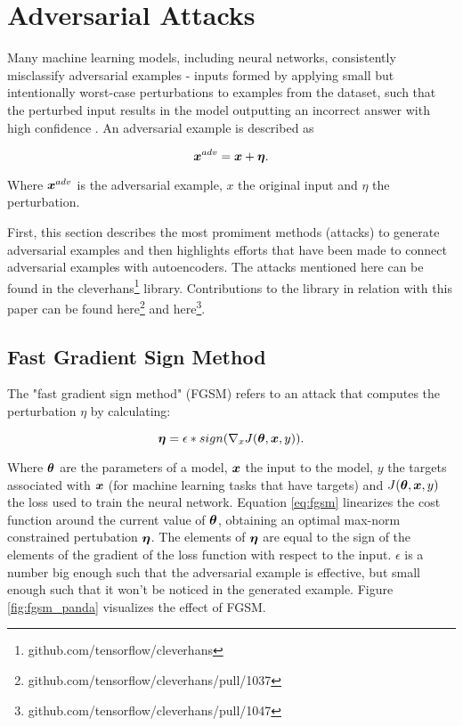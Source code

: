\section{Adversarial Attacks}\label{chap:state-of-the-art}

Many machine learning models, including neural networks, consistently
misclassify adversarial examples - inputs formed by applying small but
intentionally worst-case perturbations to examples from the dataset, such that
the perturbed input results in the model outputting an incorrect answer with
high confidence \cite{goodfellow2014explaining}. An adversarial example is
described as

\begin{equation}
    \boldsymbol{x}^{adv}  = \boldsymbol{x} + \boldsymbol{\eta}.
\end{equation}

Where $\boldsymbol{x}^{adv}$ is the adversarial example, $x$ the original input and $\eta$
the perturbation.


First, this section describes the most promiment methods (attacks) to generate
adversarial examples and then highlights efforts that have been made to connect
adversarial examples with autoencoders. The attacks mentioned here can be found
in the cleverhans\footnote{github.com/tensorflow/cleverhans} library.
Contributions to the library in relation with this paper can be found here\footnote{github.com/tensorflow/cleverhans/pull/1037}
and here\footnote{github.com/tensorflow/cleverhans/pull/1047}.

\subsection{Fast Gradient Sign Method}
The "fast gradient sign method" (FGSM) refers to an attack that computes the
perturbation $\eta$ by calculating:

\begin{equation}\label{eq:fgsm}
    \boldsymbol{\eta} = \epsilon * sign(\nabla_x J (\boldsymbol{\theta}, \boldsymbol{x}, y)).
\end{equation}

Where $\boldsymbol{\theta}$ are the parameters of a model, $\boldsymbol{x}$ the input to the
model, $y$ the targets associated with $\boldsymbol{x}$ (for machine learning tasks
that have targets) and $J(\boldsymbol{\theta}, \boldsymbol{x}, y)$ the loss used to train
the neural network. Equation \ref{eq:fgsm} linearizes the cost function around
the current value of $\boldsymbol{\theta}$, obtaining an optimal max-norm constrained
pertubation $\boldsymbol{\eta}$. The elements of $\boldsymbol{\eta}$ are equal to the sign of
the elements of the gradient of the loss function with respect to the input.
$\epsilon$ is a number big enough such that the adversarial example is
effective, but small enough such that it won't be noticed in the generated
example. Figure \ref{fig:fgsm_panda} \cite{goodfellow2014explaining} visualizes
the effect of FGSM.


